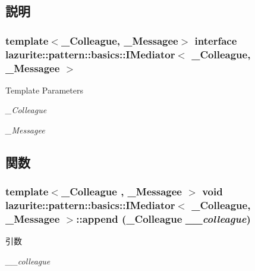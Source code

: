 \subsection{説明}
\subsubsection*{template$<$\_\-Colleague, \_\-Messagee$>$ interface lazurite::pattern::basics::IMediator$<$ \_\-Colleague, \_\-Messagee $>$}


\begin{DoxyTemplParams}{Template Parameters}
\item[{\em \_\-Colleague}]\item[{\em \_\-Messagee}]\end{DoxyTemplParams}


\subsection{関数}
\hypertarget{interfacelazurite_1_1pattern_1_1basics_1_1_i_mediator_3_01___colleague_00_01___messagee_01_4_a9c7651e26bd9e0bb57093a92ef372e66}{
\subsubsection[{append}]{\setlength{\rightskip}{0pt plus 5cm}template$<$\_\-Colleague , \_\-Messagee $>$ void lazurite::pattern::basics::IMediator$<$ \_\-Colleague, \_\-Messagee $>$::append (\_\-Colleague {\em \_\-\_\-colleague})}}
\label{interfacelazurite_1_1pattern_1_1basics_1_1_i_mediator_3_01___colleague_00_01___messagee_01_4_a9c7651e26bd9e0bb57093a92ef372e66}

\begin{DoxyParams}{引数}
\item[{\em \_\-\_\-colleague}]\end{DoxyParams}


